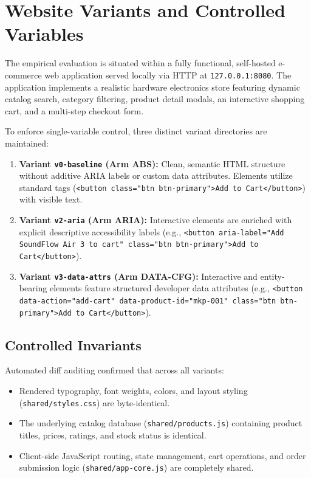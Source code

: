 \documentclass[11pt,a4paper]{article}
\begin{document}
\section{Website Variants and Controlled Variables}
\label{sec:variants}

The empirical evaluation is situated within a fully functional, self-hosted e-commerce web application served locally via HTTP at \texttt{127.0.0.1:8080}. The application implements a realistic hardware electronics store featuring dynamic catalog search, category filtering, product detail modals, an interactive shopping cart, and a multi-step checkout form.

To enforce single-variable control, three distinct variant directories are maintained:
\begin{enumerate}
    \item \textbf{Variant \texttt{v0-baseline} (Arm \textsc{ABS}):} Clean, semantic HTML structure without additive ARIA labels or custom data attributes. Elements utilize standard tags (\texttt{<button class="btn btn-primary">Add to Cart</button>}) with visible text.
    \item \textbf{Variant \texttt{v2-aria} (Arm \textsc{ARIA}):} Interactive elements are enriched with explicit descriptive accessibility labels (e.g., \texttt{<button aria-label="Add SoundFlow Air 3 to cart" class="btn btn-primary">Add to Cart</button>}).
    \item \textbf{Variant \texttt{v3-data-attrs} (Arm \textsc{DATA-CFG}):} Interactive and entity-bearing elements feature structured developer data attributes (e.g., \texttt{<button data-action="add-cart" data-product-id="mkp-001" class="btn btn-primary">Add to Cart</button>}).
\end{enumerate}

\subsection{Controlled Invariants}
Automated diff auditing confirmed that across all variants:
\begin{itemize}
    \item Rendered typography, font weights, colors, and layout styling (\texttt{shared/styles.css}) are byte-identical.
    \item The underlying catalog database (\texttt{shared/products.js}) containing product titles, prices, ratings, and stock status is identical.
    \item Client-side JavaScript routing, state management, cart operations, and order submission logic (\texttt{shared/app-core.js}) are completely shared.
\end{itemize}
\end{document}
